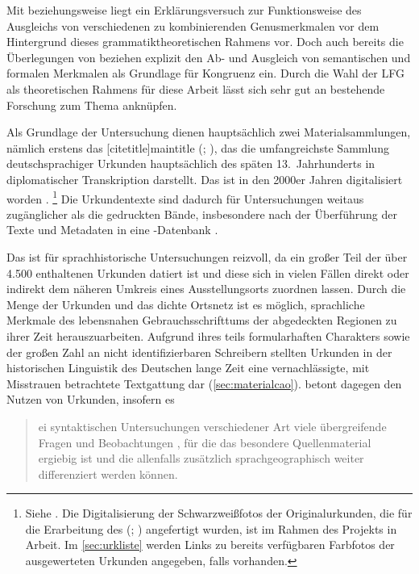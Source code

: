 Mit \citet[Kapitel~8]{wechslerzlatic2003} beziehungsweise \citet{wechsler2009}
liegt ein Erklärungsversuch zur Funktionsweise des Ausgleichs von verschiedenen
zu kombinierenden Genusmerkmalen vor dem Hintergrund dieses
grammatik\-theoretischen Rahmens vor. Doch auch bereits die Überlegungen von
\citet[237--264]{askedal1973} beziehen explizit den Ab- und Ausgleich von
semantischen und formalen Merkmalen als Grundlage für Kongruenz ein. Durch die
Wahl der LFG als theoretischen Rahmens für diese Arbeit lässt sich sehr gut an
bestehende Forschung zum Thema anknüpfen.

Als Grundlage der Untersuchung dienen hauptsächlich zwei Materialsammlungen,
nämlich erstens das [citetitle]{maintitle} (\CAO{};
\nosh\cites{cao1,cao2,cao3,cao4,caor,cao5}), das die umfangreichste Sammlung
deutschsprachiger Urkunden hauptsächlich des späten 13.~Jahrhunderts in
diplomatischer Transkription darstellt. Das \CAO{} ist in den 2000er Jahren
digitalisiert worden \autocite{cao-online}.%
%
	\footnote{Siehe . Die Digitalisierung der
		Schwarzweißfotos der Originalurkunden, die für die Erarbeitung des
		 (\WMU{};
		\nosh\cites{wmu1,wmu2,wmu3}) angefertigt wurden, ist im Rahmen des Projekts
		 in Arbeit. Im \cref{sec:urkliste}
		werden Links zu bereits verfügbaren Farbfotos der ausgewerteten
		Urkunden angegeben, falls vorhanden.}
%
Die Urkundentexte sind dadurch für Untersuchungen weitaus zugänglicher als die
gedruckten Bände, insbesondere nach der Überführung der Texte und Metadaten in
eine -Datenbank
\autocite[vgl.][]{beckerschallert2021,beckerschallert2022b}.

Das \CAO{} ist für sprachhistorische Untersuchungen reizvoll, da ein
großer Teil der über 4.500 enthaltenen Urkunden datiert ist und diese sich in
vielen Fällen direkt oder indirekt dem näheren Umkreis eines Ausstellungsorts
zuordnen lassen. Durch die Menge der Urkunden und das dichte Ortsnetz ist es
möglich, sprachliche Merkmale des lebensnahen Gebrauchsschrifttums der
abgedeckten Regionen zu ihrer Zeit herauszuarbeiten. Aufgrund ihres teils
formularhaften Charakters sowie der großen Zahl an nicht identifizierbaren
Schreibern stellten Urkunden in der historischen Linguistik des Deutschen lange
Zeit eine vernachlässigte, mit Misstrauen betrachtete Textgattung dar
(\cref{sec:materialcao}). \citet[22]{schulze2011} betont dagegen den
Nutzen von Urkunden, insofern es \blockquote{ei syntaktischen
Untersuchungen verschiedener Art \textelp{} viele übergreifende Fragen und
Beobachtungen , für die das besondere Quellenmaterial ergiebig
ist und die allenfalls zusätzlich sprachgeographisch weiter differenziert
werden können.}

